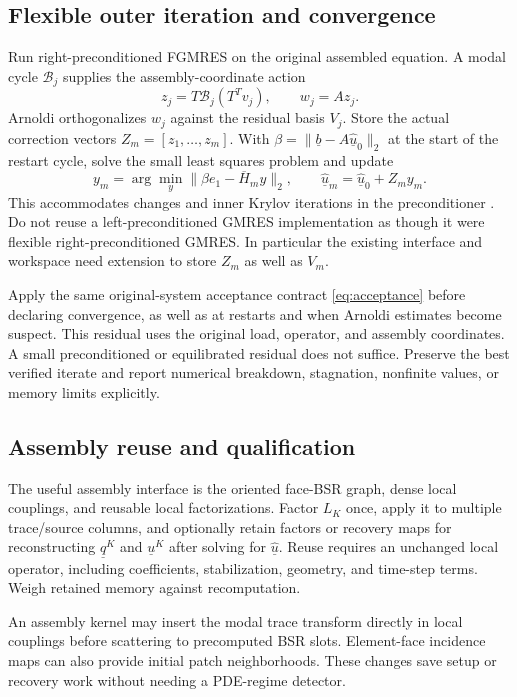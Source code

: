 \documentclass[11pt]{article}
\numberwithin{equation}{section}
\numberwithin{figure}{section}
\numberwithin{table}{section}
\newcommand{\code}[1]{\texttt{\detokenize{#1}}}
\begin{document}
\subsection{Flexible outer iteration and convergence}
Run right-preconditioned FGMRES on the original assembled equation. A modal
cycle $\mathcal B_j$ supplies the assembly-coordinate action
\[
 z_j=T\mathcal B_j(T^Tv_j),\qquad w_j=Az_j.
\]
Arnoldi orthogonalizes $w_j$ against the residual basis $V_j$. Store the
actual correction vectors $Z_m=[z_1,\ldots,z_m]$. With
$\beta=\|\underline{b}-A\underline{\widehat{u}}_0\|_2$ at the
start of the restart cycle, solve the small least squares problem and update
\[
 y_m=\arg\min_y\|\beta e_1-\overline H_my\|_2,\qquad
 \underline{\widehat{u}}_{m}
 =\underline{\widehat{u}}_{0}+Z_my_m.
\]
This accommodates changes and inner Krylov iterations in the preconditioner
\cite{fgmres}. Do not reuse a left-preconditioned GMRES implementation as
though it were flexible right-preconditioned GMRES. In particular the
existing \code{linalg/gpu/gmres.py} interface and workspace need extension to
store $Z_m$ as well as $V_m$.

Apply the same original-system acceptance contract \eqref{eq:acceptance}
before declaring convergence, as well as at restarts and when Arnoldi
estimates become suspect. This residual uses the original load, operator,
and assembly coordinates. A small preconditioned or equilibrated residual
does not suffice. Preserve the best verified iterate and report numerical
breakdown, stagnation, nonfinite values, or memory limits explicitly.

\subsection{Assembly reuse and qualification}
The useful assembly interface is the oriented face-BSR graph, dense local
couplings, and reusable local factorizations. Factor $L_K$ once, apply it
to multiple trace/source columns, and optionally retain factors or recovery
maps for reconstructing $\underline{q}^K$ and $\underline{u}^K$ after solving
for $\underline{\widehat{u}}$. Reuse requires an unchanged local
operator, including coefficients, stabilization, geometry, and time-step
terms. Weigh retained memory against recomputation.

An assembly kernel may insert the modal trace transform directly in local
couplings before scattering to precomputed BSR slots. Element-face incidence
maps can also provide initial patch neighborhoods. These changes save setup
or recovery work without needing a PDE-regime detector.
\end{document}
